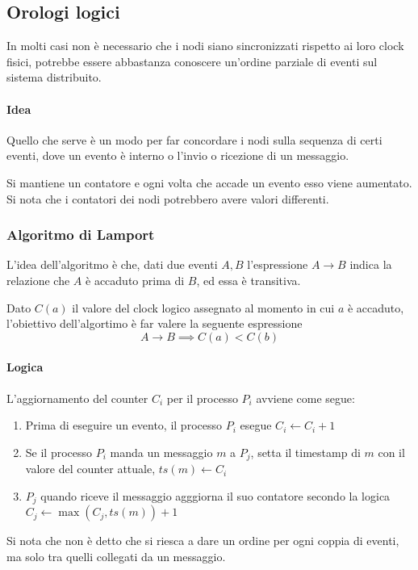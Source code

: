 \subsection{Orologi logici}

In molti casi non è necessario che i nodi siano sincronizzati 
rispetto ai loro clock fisici, potrebbe essere abbastanza 
conoscere un'ordine parziale di eventi sul sistema distribuito.

\paragraph{Idea}
Quello che serve è un modo per far concordare i nodi sulla
sequenza di certi eventi, dove un evento 
è interno o l'invio o ricezione di un messaggio. 

Si mantiene un contatore e ogni volta che accade un evento 
esso viene aumentato. Si nota che i contatori 
dei nodi potrebbero avere valori differenti.

\subsubsection{Algoritmo di Lamport}

L'idea dell'algoritmo è che, dati due eventi 
$A, B$ l'espressione $A \rightarrow B$ indica la relazione 
che $A$ è accaduto prima di $B$, ed essa è transitiva.

Dato $C(a)$ il valore del clock logico assegnato 
al momento in cui $a$ è accaduto, l'obiettivo dell'algortimo 
è far valere la seguente espressione
$$A \rightarrow B \implies C(a) < C(b)$$

\paragraph{Logica}
L'aggiornamento del counter $C_i$ per il 
processo $P_i$ avviene come segue: 
\begin{enumerate}
    \item Prima di eseguire un evento, il processo $P_i$ 
    esegue $C_i \gets C_i + 1$
    \item Se il processo $P_i$ manda un messaggio $m$ a $P_j$, 
    setta il timestamp di $m$ con il valore del counter attuale, 
    $ts(m) \gets C_i$
    \item $P_j$ quando riceve il messaggio agggiorna il suo 
    contatore secondo la logica $C_j \gets \max(C_j, ts(m)) + 1$
\end{enumerate}
Si nota che non è detto che si riesca a dare un ordine per ogni 
coppia di eventi, ma solo tra quelli collegati da un messaggio.

